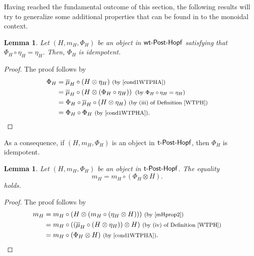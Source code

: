 \documentclass[pdftex]{sigma}
\numberwithin{equation}{section}
\newtheorem{Lemma}[Theorem]{Lemma}
 { \theoremstyle{definition}
\newtheorem{Definition}[Theorem]{Definition}
\newtheorem{Example}[Theorem]{Example}
\newtheorem{Remark}[Theorem]{Remark} }
\begin{document}
Having reached the fundamental outcome of this section, the following results will try to generalize some additional properties that can be found in \cite{Wang} to the monoidal context.
\begin{Lemma}\label{Phiidemp}
Let $(H,m_{H},\Phi_{H})$ be an object in ${\sf wt}\textnormal{-}\sf{Post}\textnormal{-}\sf{Hopf}$ satisfying that $\Phi_{H}\circ\eta_{H}=\eta_{H}$. Then, $\Phi_{H}$ is idempotent.
\end{Lemma}
\begin{proof}The proof follows by
\begin{align*}
\Phi_{H}={}&\overline{\mu}_{H}\circ(H\otimes\eta_{H})\ \text{\footnotesize\textnormal{(by \eqref{cond1WTPHA})}}\\
={}&\overline{\mu}_{H}\circ\left(H\otimes(\Phi_{H}\circ\eta_{H})\right)\ \text{\footnotesize\textnormal{(by $\Phi_{H}\circ\eta_{H}=\eta_{H}$)}}\\
={}&\Phi_{H}\circ\overline{\mu}_{H}\circ(H\otimes\eta_{H})\ \text{\footnotesize\textnormal{(by (iii) of Definition \ref{WTPH})}}\\
={}&\Phi_{H}\circ\Phi_{H}\ \text{\footnotesize\textnormal{(by \eqref{cond1WTPHA})}}.\tag*{\qed}
\end{align*}
\renewcommand{\qed}{}
\end{proof}

As a consequence, if $(H,m_{H},\Phi_{H})$ is an object in ${\sf t}\textnormal{-}\sf{Post}\textnormal{-}\sf{Hopf}$, then $\Phi_{H}$ is idempotent.
\begin{Lemma}
Let $(H,m_{H},\Phi_{H})$ be an object in ${\sf t}\textnormal{-}\sf{Post}\textnormal{-}\sf{Hopf}$. The equality
\begin{equation}\label{mconPHI}
m_{H}=m_{H}\circ(\Phi_{H}\otimes H).
\end{equation}
holds.
\end{Lemma}
\begin{proof}The proof follows by
\begin{align*}
m_{H}={}&m_{H}\circ(H\otimes(m_{H}\circ(\eta_{H}\otimes H)))\ \text{\footnotesize\textnormal{(by \eqref{mHprop2})}}\\
={}&m_{H}\circ((\overline{\mu}_{H}\circ(H\otimes\eta_{H}))\otimes H)\ \text{\footnotesize\textnormal{(by (iv) of Definition \ref{WTPH})}}\\
={}&m_{H}\circ(\Phi_{H}\otimes H)\ \text{\footnotesize\textnormal{(by \eqref{cond1WTPHA})}}.\tag*{\qed}
\end{align*}
\renewcommand{\qed}{}
\end{proof}
\end{document}
